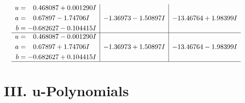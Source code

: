 \documentclass[1p]{elsarticle_modified}
\theoremstyle{definition}
\begin{document}
$$\begin{array}{c|c|c}
\begin{aligned}
u &= \phantom{-}0.468087 + 0.001290 I \\
a &= \phantom{-}0.67897 - 1.74706 I \\
b &= -0.682627 - 0.104415 I\end{aligned}
 & -1.36973 - 1.50897 I & -13.46764 + 1.98399 I \\ \hline\begin{aligned}
u &= \phantom{-}0.468087 - 0.001290 I \\
a &= \phantom{-}0.67897 + 1.74706 I \\
b &= -0.682627 + 0.104415 I\end{aligned}
 & -1.36973 + 1.50897 I & -13.46764 - 1.98399 I\\
 \hline 
 \end{array}$$\newpage
\newpage\renewcommand{\arraystretch}{1}
\centering \section*{ III. u-Polynomials}
\end{document}
